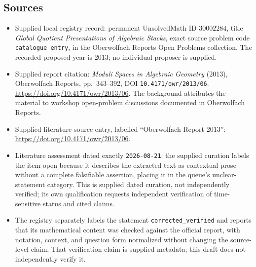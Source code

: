 \documentclass[11pt]{article}
\begin{document}
\subsection{Sources}
\begin{itemize}
\item Supplied local registry record: permanent UnsolvedMath ID \(30002284\), title \emph{Global Quotient Presentations of Algebraic Stacks}, exact source problem code \texttt{catalogue entry}, in the Oberwolfach Reports Open Problems collection. The recorded proposed year is 2013; no individual proposer is supplied.
\item Supplied report citation: \emph{Moduli Spaces in Algebraic Geometry} (2013), Oberwolfach Reports, pp.\ 343--392, DOI \texttt{10.4171/owr/2013/06}. \url{https://doi.org/10.4171/owr/2013/06}. The background attributes the material to workshop open-problem discussions documented in Oberwolfach Reports.
\item Supplied literature-source entry, labelled ``Oberwolfach Report 2013'': \url{https://doi.org/10.4171/owr/2013/06}.
\item Literature assessment dated exactly \texttt{2026-08-21}: the supplied curation labels the item open because it describes the extracted text as contextual prose without a complete falsifiable assertion, placing it in the queue's unclear-statement category. This is supplied dated curation, not independently verified; its own qualification requests independent verification of time-sensitive status and cited claims.
\item The registry separately labels the statement \texttt{corrected\_verified} and reports that its mathematical content was checked against the official report, with notation, context, and question form normalized without changing the source-level claim. That verification claim is supplied metadata; this draft does not independently verify it.
\end{itemize}
\end{document}
